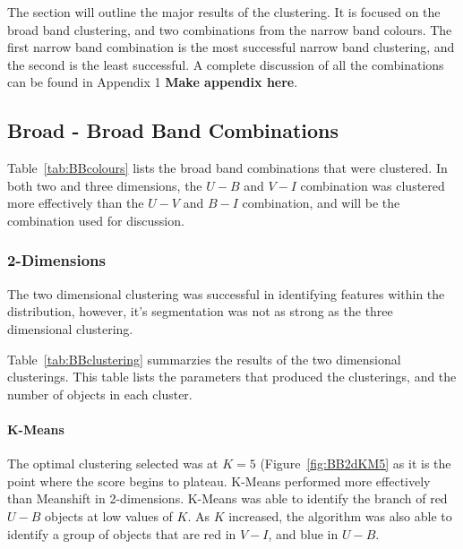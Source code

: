
The section will outline the major results of the clustering. 
It is focused on the broad band clustering, and two combinations from the narrow band colours.
The first narrow band combination is the most successful narrow band clustering, and the second is the least successful.
A complete discussion of all the combinations can be found in Appendix 1 \textbf{Make appendix here}.

\subsection{Broad - Broad Band Combinations}
Table~\ref{tab:BBcolours} lists the broad band combinations that were clustered. 
In both two and three dimensions, the $U - B$ and $V - I$ combination was clustered more effectively than the $U - V$ and $B - I$ combination, and will be the combination used for discussion.

\subsubsection{2-Dimensions}
The two dimensional clustering was successful in identifying features within the distribution, however, it's segmentation was not as strong as the three dimensional clustering. 

Table~\ref{tab:BBclustering} summarzies the results of the two dimensional clusterings.
This table lists the parameters that produced the clusterings, and the number of objects in each cluster.

\paragraph{K-Means}
The optimal clustering selected was at $K=5$ (Figure~\ref{fig:BB2dKM5} as it is the point where the score begins to plateau.
K-Means performed more effectively than Meanshift in 2-dimensions.
K-Means was able to identify the branch of red $U - B$ objects at low values of $K$.
As $K$ increased, the algorithm was also able to identify a group of objects that are red in $V - I$, and blue in $U - B$. 

